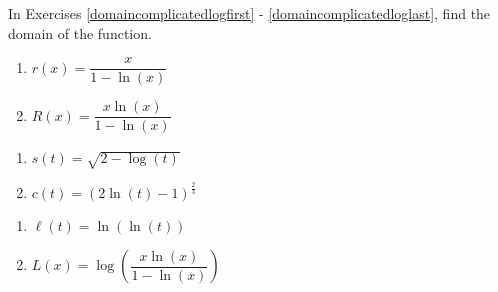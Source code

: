 \documentclass{ximera}
\begin{document}
In Exercises \ref{domaincomplicatedlogfirst} - \ref{domaincomplicatedloglast},  find the domain of the function.

\begin{enumerate}
\setcounter{enumi}{\value{HW}}

\item \label{domaincomplicatedlogfirst}  $r(x) =   \dfrac{x}{1 - \ln(x)}$  %

\item   $R(x) = \dfrac{x \ln(x)}{1 - \ln(x)}$   %

\setcounter{HW}{\value{enumi}}
\end{enumerate}


\begin{enumerate}
\setcounter{enumi}{\value{HW}}

\item     $s(t) = \sqrt{2 - \log(t)}$   %
\item     $c(t) =  (2 \ln(t) -1)^{\frac{2}{3}}$  %

\setcounter{HW}{\value{enumi}}
\end{enumerate}

\begin{enumerate}
\setcounter{enumi}{\value{HW}}
  
\item     $\ell(t) = \ln( \ln(t))$   %

\item  \label{domaincomplicatedloglast}    $L(x) = \log\left( \dfrac{x \ln(x)}{1 - \ln(x)} \right)$  %


\setcounter{HW}{\value{enumi}}
\end{enumerate}
\end{document}
